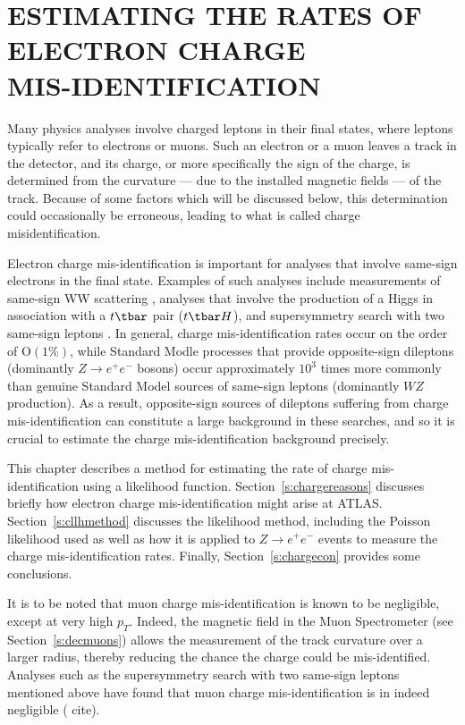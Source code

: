 
\chapter{ESTIMATING THE RATES OF ELECTRON CHARGE
\\MIS-IDENTIFICATION}\label{c:cid}

Many physics analyses involve charged leptons in their final states, where
leptons typically refer to electrons or muons. Such an electron or a muon
leaves a track in the detector, and its charge, or more specifically the sign
of the charge, is determined from the curvature --- due to the installed
magnetic fields --- of the track. Because of some factors which will be
discussed below, this determination could occasionally be erroneous, leading to
what is called charge misidentification.

Electron charge mis-identification is important for analyses that involve
same-sign electrons in the final state. Examples of such analyses include
measurements of same-sign WW scattering \cite{sswwscatting}, analyses that
involve the production of a Higgs in association with a $t\tbar$ pair ($t\tbar
H$), and supersymmetry search with two same-sign leptons \cite{ssssleptons}. In
general, charge mis-identification rates occur on the order of $\text{O}(1\%)$,
while Standard Modle processes that provide opposite-sign dileptons (dominantly
$Z\to e^+e^-$ bosons) occur approximately $10^3$ times more commonly than
genuine Standard Model sources of same-sign leptons (dominantly $WZ$
production). As a result, opposite-sign sources of dileptons suffering from
charge mis-identification can constitute a large background in these searches,
and so it is crucial to estimate the charge mis-identification background
precisely.



This chapter describes a method for estimating the rate of charge
mis-identification using a likelihood function. Section~\ref{s:chargereasons}
discusses briefly how electron charge mis-identification might arise at ATLAS.
Section~\ref{s:cllhmethod} discusses the likelihood method, including the
Poisson likelihood used as well as how it is applied to $Z\to e^+e^-$ events to
measure the charge mis-identification rates. Finally, Section~\ref{s:chargecon}
provides some conclusions.

It is to be noted that muon charge mis-identification is known to be
negligible, except at very high $p_T$. Indeed, the magnetic field in the Muon
Spectrometer (see Section~\ref{s:decmuons}) allows the measurement of the track
curvature over a larger radius, thereby reducing the chance the charge could be
mis-identified. Analyses such as the supersymmetry search with two same-sign
leptons mentioned above have found that muon charge mis-identification is in
indeed negligible ({\color{pink} cite}).



